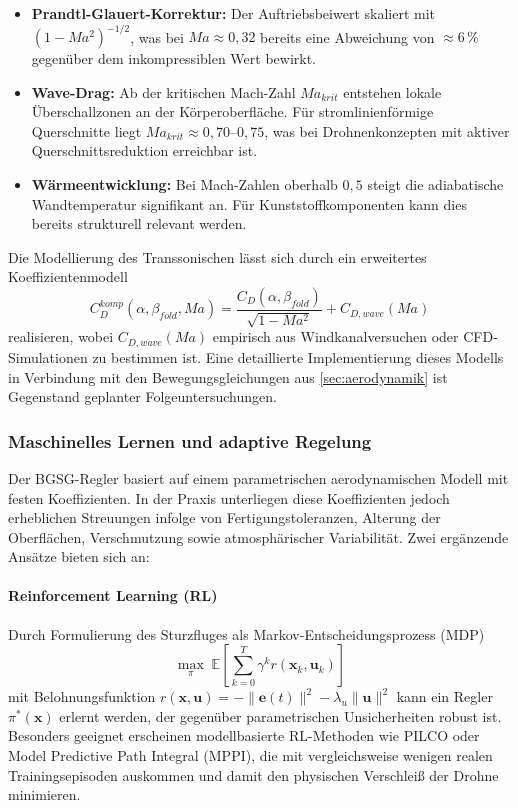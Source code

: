 ﻿\documentclass[12pt,a4paper]{article}
\theoremstyle{remark}
\begin{document}
	\begin{itemize}
		\item \textbf{Prandtl-Glauert-Korrektur:} Der Auftriebsbeiwert skaliert mit $(1 - Ma^2)^{-1/2}$, was bei $Ma \approx 0{,}32$ bereits eine Abweichung von $\approx 6\,\%$ gegenüber dem inkompressiblen Wert bewirkt.
		\item \textbf{Wave-Drag:} Ab der kritischen Mach-Zahl $Ma_{krit}$ entstehen lokale Überschallzonen an der Körperoberfläche. Für stromlinienförmige Querschnitte liegt $Ma_{krit} \approx 0{,}70$--$0{,}75$, was bei Drohnenkonzepten mit aktiver Querschnittsreduktion erreichbar ist.
		\item \textbf{Wärmeentwicklung:} Bei Mach-Zahlen oberhalb $0{,}5$ steigt die adiabatische Wandtemperatur signifikant an. Für Kunststoffkomponenten kann dies bereits strukturell relevant werden.
	\end{itemize}

	Die Modellierung des Transsonischen lässt sich durch ein erweitertes Koeffizientenmodell
	\begin{equation}
		C_D^{komp}(\alpha, \beta_{fold}, Ma) = \frac{C_D(\alpha, \beta_{fold})}{\sqrt{1 - Ma^2}} + C_{D,wave}(Ma)
	\end{equation}
	realisieren, wobei $C_{D,wave}(Ma)$ empirisch aus Windkanalversuchen oder CFD-Simulationen zu bestimmen ist. Eine detaillierte Implementierung dieses Modells in Verbindung mit den Bewegungsgleichungen aus \cref{sec:aerodynamik} ist Gegenstand geplanter Folgeuntersuchungen.

	\subsubsection{Maschinelles Lernen und adaptive Regelung}

	Der BGSG-Regler basiert auf einem parametrischen aerodynamischen Modell mit festen Koeffizienten. In der Praxis unterliegen diese Koeffizienten jedoch erheblichen Streuungen infolge von Fertigungstoleranzen, Alterung der Oberflächen, Verschmutzung sowie atmosphärischer Variabilität. Zwei ergänzende Ansätze bieten sich an:

	\paragraph{Reinforcement Learning (RL)} Durch Formulierung des Sturzfluges als Markov-Entscheidungsprozess (MDP)
	\begin{equation}
		\max_{\pi} \; \mathbb{E}\left[\sum_{k=0}^{T} \gamma^k r(\mathbf{x}_k, \mathbf{u}_k)\right]
	\end{equation}
	mit Belohnungsfunktion $r(\mathbf{x}, \mathbf{u}) = -\|\mathbf{e}(t)\|^2 - \lambda_u \|\mathbf{u}\|^2$ kann ein Regler $\pi^*(\mathbf{x})$ erlernt werden, der gegenüber parametrischen Unsicherheiten robust ist. Besonders geeignet erscheinen modellbasierte RL-Methoden wie PILCO oder Model Predictive Path Integral (MPPI), die mit vergleichsweise wenigen realen Trainingsepisoden auskommen und damit den physischen Verschleiß der Drohne minimieren.
\end{document}

